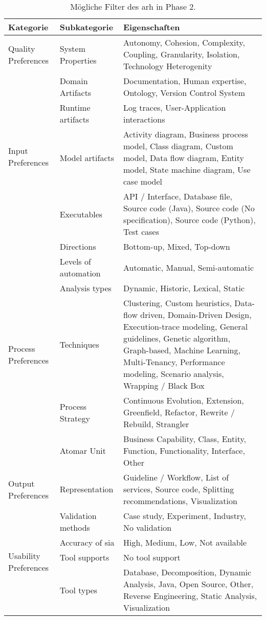 \begin{table}
  \centering
  \begin{tabular}{m{2cm} m{2cm} m{9cm}}
    \toprule
    \textbf{Kategorie} & \textbf{Subkategorie} & \textbf{Eigenschaften} \\
    \midrule
    Quality Preferences & System Properties & Autonomy, Cohesion, Complexity, Coupling, Granularity, Isolation, Technology Heterogenity \\ \hline
    \multirow{4}{=}[-1cm]{Input Preferences} & Domain Artifacts &  Documentation, Human expertise, Ontology, Version Control System \\ \cline{2-3}
    & Runtime artifacts & Log traces, User-Application interactions \\ \cline{2-3}
    & Model artifacts & Activity diagram, Business process model, Class diagram, Custom model, Data flow diagram, Entity model, State machine diagram, Use case model \\ \cline{2-3}
    & Executables & API / Interface, Database file, Source code (Java), Source code (No specification), Source code (Python), Test cases \\ \hline
    \multirow{6}{=}[-1.9cm]{Process Preferences} & Directions & Bottom-up, Mixed, Top-down \\ \cline{2-3}
    & Levels of automation & Automatic, Manual, Semi-automatic \\ \cline{2-3}
    & Analysis types & Dynamic, Historic, Lexical, Static \\ \cline{2-3}
    & Techniques & Clustering, Custom heuristics, Data-flow driven, Domain-Driven Design, Execution-trace modeling, General guidelines, Genetic algorithm, Graph-based, Machine Learning, Multi-Tenancy, Performance modeling, Scenario analysis, Wrapping / Black Box \\ \cline{2-3}
    & Process Strategy & Continuous Evolution, Extension, Greenfield, Refactor, Rewrite / Rebuild, Strangler \\ \cline{2-3}
    & Atomar Unit & Business Capability, Class, Entity, Function, Functionality, Interface, Other \\ \hline
    Output Preferences & Representation & Guideline / Workflow, List of services, Source code, Splitting recommendations, Visualization \\ \hline
    \multirow{4}{=}[-1cm]{Usability Preferences} &Validation methods & Case study, Experiment, Industry, No validation \\ \cline{2-3}
    & Accuracy of \gls{sia} & High, Medium, Low, Not available \\ \cline{2-3}
    & Tool supports &  No tool support \\ \cline{2-3}
    & Tool types & Database, Decomposition, Dynamic Analysis, Java, Open Source, Other, Reverse Engineering, Static Analysis, Visualization \\
    \bottomrule
  \end{tabular}
  \caption[Mögliche Filter des \gls{arh} in Phase 2]{
    Mögliche Filter des \gls{arh} in Phase 2.
  }
  \label{tab:phase2-filter}
\end{table}
